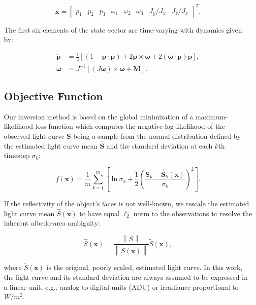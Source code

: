 \documentclass[a4paper,twocolumn]{spaceDebrisC} %
\newcommand{\vctr}[1]{\bm{#1}}
\newcommand{\norm}[1]{\left\lVert#1\right\rVert}
\begin{document}
\begin{equation}
 \vctr{x} = \begin{bmatrix} 
 p_1 & p_2 & p_3 & \omega_1 & \omega_2 & \omega_3 & J_y / J_x & J_z / J_x
  \end{bmatrix}^T.
\end{equation}

The first six elements of the state vector are time-varying with dynamics given by:

\begin{align}
 \vctr{\dot{p}} &= \frac{1}{4} \left[ \left(1 - \vctr{p} \cdot \vctr{p}\right) + 2\vctr{p} \times \vctr{\omega} + 2 \left(\vctr{\omega} \cdot \vctr{p} \right)\vctr{p} \right], \label{eq:mrp_kde} \\
 \vctr{\dot{\omega}} &= J^{-1} \left[ \left(J \vctr{\omega}\right) \times \vctr{\omega} + \vctr{M}\right]. \label{eq:rbtf_dynamics}
\end{align}

\subsection{Objective Function}

Our inversion method is based on the global minimization of a maximum-likelihood loss function which computes the negative log-likelihood of the observed light curve $\vctr{S}$ being a sample from the normal distribution defined by the estimated light curve mean $\hat{\vctr{S}}$ and the standard deviation at each $k$th timestep $\sigma_k$:

\begin{equation} \label{eq:nll_loss}
 f(\vctr{x}) = \frac{1}{m}\sum_{k=1}^{m}\left[\ln\sigma_k + \frac{1}{2}\left(\frac{\vctr{S}_k - \hat{\vctr{S}}_k(\vctr{x})}{\sigma_k}\right)^2 \right].
 \end{equation}

If the reflectivity of the object's faces is not well-known, we rescale the estimated light curve mean $\hat{S}(\vctr{x})$ to have equal $\ell_2$ norm to the observations to resolve the inherent albedo-area ambiguity:

\begin{equation}
 \hat{S}(\vctr{x}) = \frac{\norm{S}}{\norm{\tilde{S}(\vctr{x})}} \tilde{S}(\vctr{x}),
\end{equation}

\noindent
where $\tilde{S}(\vctr{x})$ is the original, poorly scaled, estimated light curve. In this work, the light curve and its standard deviation are always assumed to be expressed in a linear unit, e.g., analog-to-digital units (ADU) or irradiance proportional to $W/m^2$.
\end{document}
